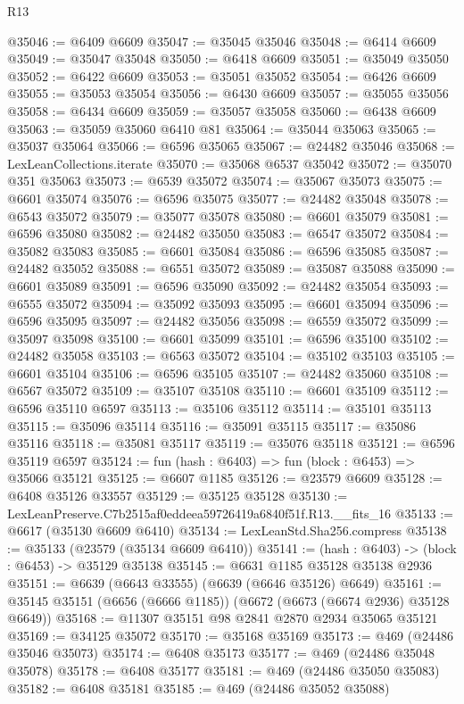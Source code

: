 \begin{lexlean}{R13}
\begin{coremodule}
@35046 := @6409 @6609
@35047 := @35045 @35046
@35048 := @6414 @6609
@35049 := @35047 @35048
@35050 := @6418 @6609
@35051 := @35049 @35050
@35052 := @6422 @6609
@35053 := @35051 @35052
@35054 := @6426 @6609
@35055 := @35053 @35054
@35056 := @6430 @6609
@35057 := @35055 @35056
@35058 := @6434 @6609
@35059 := @35057 @35058
@35060 := @6438 @6609
@35063 := @35059 @35060 @6410 @81
@35064 := @35044 @35063
@35065 := @35037 @35064
@35066 := @6596 @35065
@35067 := @24482 @35046
@35068 := LexLeanCollections.iterate
@35070 := @35068 @6537 @35042
@35072 := @35070 @351 @35063
@35073 := @6539 @35072
@35074 := @35067 @35073
@35075 := @6601 @35074
@35076 := @6596 @35075
@35077 := @24482 @35048
@35078 := @6543 @35072
@35079 := @35077 @35078
@35080 := @6601 @35079
@35081 := @6596 @35080
@35082 := @24482 @35050
@35083 := @6547 @35072
@35084 := @35082 @35083
@35085 := @6601 @35084
@35086 := @6596 @35085
@35087 := @24482 @35052
@35088 := @6551 @35072
@35089 := @35087 @35088
@35090 := @6601 @35089
@35091 := @6596 @35090
@35092 := @24482 @35054
@35093 := @6555 @35072
@35094 := @35092 @35093
@35095 := @6601 @35094
@35096 := @6596 @35095
@35097 := @24482 @35056
@35098 := @6559 @35072
@35099 := @35097 @35098
@35100 := @6601 @35099
@35101 := @6596 @35100
@35102 := @24482 @35058
@35103 := @6563 @35072
@35104 := @35102 @35103
@35105 := @6601 @35104
@35106 := @6596 @35105
@35107 := @24482 @35060
@35108 := @6567 @35072
@35109 := @35107 @35108
@35110 := @6601 @35109
@35112 := @6596 @35110 @6597
@35113 := @35106 @35112
@35114 := @35101 @35113
@35115 := @35096 @35114
@35116 := @35091 @35115
@35117 := @35086 @35116
@35118 := @35081 @35117
@35119 := @35076 @35118
@35121 := @6596 @35119 @6597
@35124 := fun (hash : @6403) => fun (block : @6453) => @35066 @35121
@35125 := @6607 @1185
@35126 := @23579 @6609
@35128 := @6408 @35126 @33557
@35129 := @35125 @35128
@35130 := LexLeanPreserve.C7b2515af0eddeea59726419a6840f51f.R13.__fits_16
@35133 := @6617 (@35130 @6609 @6410)
@35134 := LexLeanStd.Sha256.compress
@35138 := @35133 (@23579 (@35134 @6609 @6410))
@35141 := (hash : @6403) -> (block : @6453) -> @35129 @35138
@35145 := @6631 @1185 @35128 @35138 @2936
@35151 := @6639 (@6643 @33555) (@6639 (@6646 @35126) @6649)
@35161 := @35145 @35151 (@6656 (@6666 @1185)) (@6672 (@6673 (@6674 @2936) @35128 @6649))
@35168 := @11307 @35151 @98 @2841 @2870 @2934 @35065 @35121
@35169 := @34125 @35072
@35170 := @35168 @35169
@35173 := @469 (@24486 @35046 @35073)
@35174 := @6408 @35173
@35177 := @469 (@24486 @35048 @35078)
@35178 := @6408 @35177
@35181 := @469 (@24486 @35050 @35083)
@35182 := @6408 @35181
@35185 := @469 (@24486 @35052 @35088)

\end{coremodule}
\end{lexlean}
